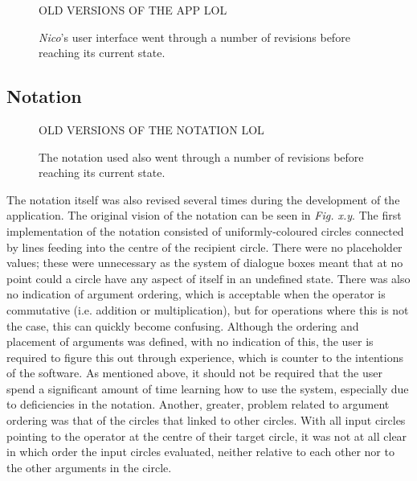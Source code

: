 \documentclass[12pt,twoside,notitlepage,xetex]{report}
\begin{document}
\begin{center}
\begin{figure}[H]
\begin{center}
{\Huge \sfapp OLD VERSIONS OF THE APP LOL}
\end{center}
\caption{\emph{Nico}'s user interface went through a number of revisions before reaching its current state.}
\end{figure}
\end{center}

\subsection{Notation}%

\begin{center}
\begin{figure}[H]
\begin{center}
{\Huge \sfapp OLD VERSIONS OF THE NOTATION LOL}
\end{center}
\caption{The notation used also went through a number of revisions before reaching its current state.}
\end{figure}
\end{center}

The notation itself was also revised several times during the development of
the application.  The original vision of the notation can be seen in
\emph{Fig. x.y}.  The first implementation of the notation consisted of
uniformly-coloured circles connected by lines feeding into the centre of the
recipient circle.  There were no placeholder values; these were unnecessary as
the system of dialogue boxes meant that at no point could a circle have any
aspect of itself in an undefined state.  There was also no indication of
argument ordering, which is acceptable when the operator is commutative (i.e.
addition or multiplication), but for operations where this is not the case,
this can quickly become confusing.  Although the ordering and placement of
arguments was defined, with no indication of this, the user is required to
figure this out through experience, which is counter to the intentions of the
software.  As mentioned above, it should not be required that the user spend a
significant amount of time learning how to use the system, especially due to
deficiencies in the notation.  Another, greater, problem related to argument
ordering was that of the circles that linked to other circles.  With all input
circles pointing to the operator at the centre of their target circle, it was
not at all clear in which order the input circles evaluated, neither relative
to each other nor to the other arguments in the circle.
\end{document}
